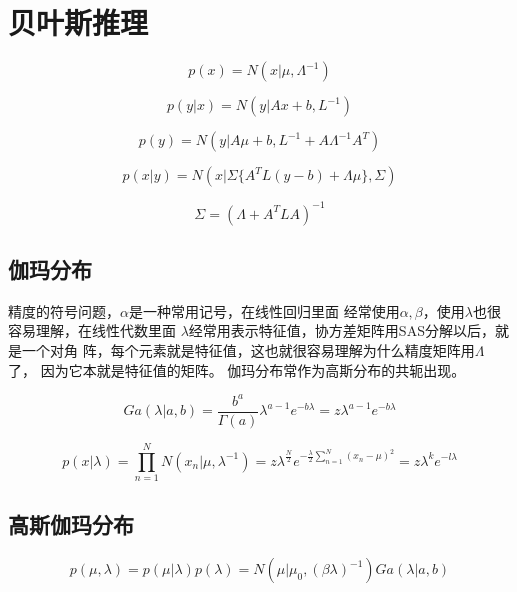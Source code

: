 \section{贝叶斯推理}
\begin{equation}
p(x) = N(x|\mu, \Lambda^{-1})
\end{equation}

\begin{equation}
p(y|x) = N(y|Ax + b, L^{-1})
\end{equation}

\begin{equation}
p(y) = N(y|A\mu + b, L^{-1} + A\Lambda^{-1}A^T)
\end{equation}

\begin{equation}
p(x|y) = N(x|\Sigma\{A^TL(y-b) + \Lambda\mu\}, \Sigma)
\end{equation}

\begin{equation}
\Sigma = (\Lambda + A^TLA)^{-1}
\end{equation}

\subsection{伽玛分布}
精度的符号问题，$\alpha$是一种常用记号，在线性回归里面
经常使用$\alpha,\beta$，使用$\lambda$也很容易理解，在线性代数里面
$\lambda$经常用表示特征值，协方差矩阵用SAS分解以后，就是一个对角
阵，每个元素就是特征值，这也就很容易理解为什么精度矩阵用$\Lambda$了，
因为它本就是特征值的矩阵。
伽玛分布常作为高斯分布的共轭出现。

\begin{equation}
Ga(\lambda|a, b) = \frac{b^a}{\Gamma(a)}\lambda^{a-1}e^{-b\lambda}
= z \lambda^{a-1}e^{-b\lambda}
\end{equation}

\begin{equation}
p(x|\lambda) = \prod_{n=1}^NN(x_n|\mu, \lambda^{-1})
= z \lambda^{\frac{N}{2}}e^{-\frac{\lambda}{2}\sum_{n=1}^N(x_n-\mu)^2}
= z \lambda^ke^{-l \lambda}
\end{equation}

\subsection{高斯伽玛分布}
\begin{equation}
p(\mu, \lambda) = p(\mu|\lambda)p(\lambda)
= N(\mu|\mu_0, (\beta \lambda)^{-1})Ga(\lambda|a, b)
\end{equation}

